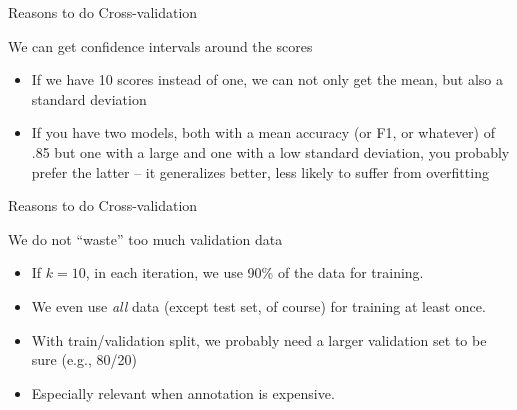 \documentclass[compress]{beamer}
\begin{document}
\begin{frame}{Reasons to do Cross-validation}
	\begin{block}{We can get confidence intervals around the scores}
		\begin{itemize}
			\item If we have 10 scores instead of one, we can not only get the mean, but also a standard deviation
			\item If you have two models, both with a mean accuracy (or F1, or whatever) of .85 but one with a large and one with a low standard deviation, you probably prefer the latter -- it generalizes better, less likely to suffer from overfitting
		\end{itemize}	
	\end{block}

\end{frame}

\begin{frame}{Reasons to do Cross-validation}
	\begin{block}{We do not ``waste'' too much validation data}
		\begin{itemize}
			\item If $k=10$, in each iteration, we use 90\% of the data for training.
			\item We even use \emph{all} data (except test set, of course) for training at least once.
			\item With train/validation split, we probably need a larger validation set to be sure (e.g., 80/20)
			\item Especially relevant when annotation is expensive.
		\end{itemize}
	\end{block}
\end{frame}
\end{document}

